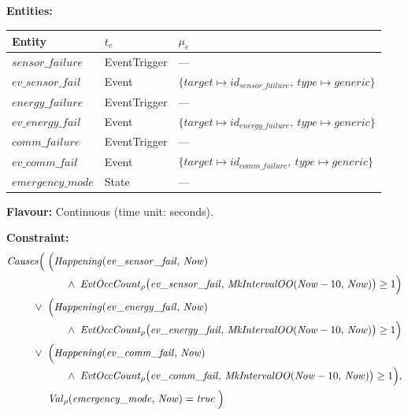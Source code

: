 \medskip
\textbf{Entities:}
\begin{center}
\begin{tabular}{lll}
    \toprule
    \textbf{Entity} & $t_e$ & $\mu_e$ \\
    \midrule
    $\mathit{sensor\_failure}$  & EventTrigger & --- \\
    $\mathit{ev\_sensor\_fail}$ & Event & $\{\mathit{target} \mapsto id_{\mathit{sensor\_failure}},\ \mathit{type} \mapsto \mathit{generic}\}$ \\
    $\mathit{energy\_failure}$  & EventTrigger & --- \\
    $\mathit{ev\_energy\_fail}$ & Event & $\{\mathit{target} \mapsto id_{\mathit{energy\_failure}},\ \mathit{type} \mapsto \mathit{generic}\}$ \\
    $\mathit{comm\_failure}$    & EventTrigger & --- \\
    $\mathit{ev\_comm\_fail}$   & Event & $\{\mathit{target} \mapsto id_{\mathit{comm\_failure}},\ \mathit{type} \mapsto \mathit{generic}\}$ \\
    $\mathit{emergency\_mode}$  & State & --- \\
    \bottomrule
\end{tabular}
\end{center}

\textbf{Flavour:} Continuous (time unit: seconds).

\textbf{Constraint:}
\begin{align*}
    \mathit{Causes}\Bigl(
        &\;\Bigl(\mathit{Happening}(\mathit{ev\_sensor\_fail},\, \mathit{Now}) \\
        &\qquad\land\; \mathit{EvtOccCount}_\rho\bigl(\mathit{ev\_sensor\_fail},\, \mathit{MkIntervalOO}(\mathit{Now} - 10,\, \mathit{Now})\bigr) \geq 1\Bigr) \\
        \lor\;
        &\;\Bigl(\mathit{Happening}(\mathit{ev\_energy\_fail},\, \mathit{Now}) \\
        &\qquad\land\; \mathit{EvtOccCount}_\rho\bigl(\mathit{ev\_energy\_fail},\, \mathit{MkIntervalOO}(\mathit{Now} - 10,\, \mathit{Now})\bigr) \geq 1\Bigr) \\
        \lor\;
        &\;\Bigl(\mathit{Happening}(\mathit{ev\_comm\_fail},\, \mathit{Now}) \\
        &\qquad\land\; \mathit{EvtOccCount}_\rho\bigl(\mathit{ev\_comm\_fail},\, \mathit{MkIntervalOO}(\mathit{Now} - 10,\, \mathit{Now})\bigr) \geq 1\Bigr), \\
        &\;\mathit{Val}_\rho(\mathit{emergency\_mode},\, \mathit{Now}) = \mathit{true}
    \;\Bigr)
\end{align*}

